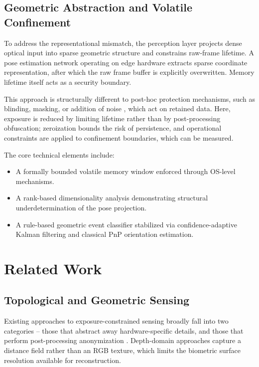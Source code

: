 \documentclass[conference]{IEEEtran}
\begin{document}
\subsection{Geometric Abstraction and Volatile Confinement}
To address the representational mismatch, the perception layer projects dense optical input into sparse geometric structure and constrains raw-frame lifetime. A pose estimation network operating on edge hardware extracts sparse coordinate representation, after which the raw frame buffer is explicitly overwritten. Memory lifetime itself acts as a security boundary.

This approach is structurally different to post-hoc protection mechanisms, such as blinding, masking, or addition of noise \cite{b3, b4}, which act on retained data. Here, exposure is reduced by limiting lifetime rather than by post-processing obfuscation; zeroization bounds the risk of persistence, and operational constraints are applied to confinement boundaries, which can be measured.

The core technical elements include:
\begin{itemize}
    \item A formally bounded volatile memory window enforced through OS-level mechanisms.
    \item A rank-based dimensionality analysis demonstrating structural underdetermination of the pose projection.
    \item A rule-based geometric event classifier stabilized via confidence-adaptive Kalman filtering and classical PnP orientation estimation.
\end{itemize}

\section{Related Work}

\subsection{Topological and Geometric Sensing}
Existing approaches to exposure-constrained sensing broadly fall into two categories – those that abstract away hardware-specific details, and those that perform post-processing anonymization \cite{b5}. Depth-domain approaches capture a distance field rather than an RGB texture, which limits the biometric surface resolution available for reconstruction.
\end{document}

